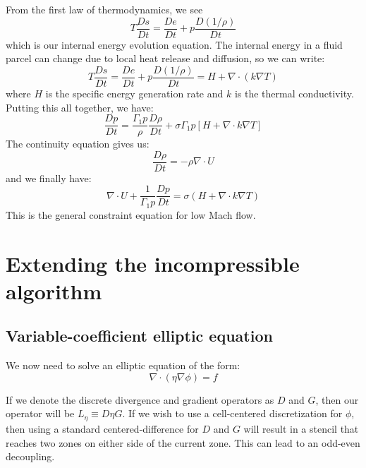 From the first law of thermodynamics, we see
\begin{equation}
T \frac{Ds}{Dt} = \frac{De}{Dt} + p \frac{D(1/\rho)}{Dt}
\end{equation}
which is our internal energy evolution equation.  The internal
energy in a fluid parcel can change due to local heat release and 
diffusion, so we can write:
\begin{equation}
T \frac{Ds}{Dt} = \frac{De}{Dt} + p \frac{D(1/\rho)}{Dt} = H + \nabla \cdot (k \nabla T)
\end{equation}
where $H$ is the specific energy generation rate and $k$ is the 
thermal conductivity.  Putting this all together, we have:
\begin{equation}
\frac{Dp}{Dt} = \frac{\Gamma_1 p}{\rho} \frac{D\rho}{Dt}
   + \sigma \Gamma_1 p \left [ H + \nabla \cdot k \nabla T \right ]
\end{equation}
The continuity equation gives us:
\begin{equation}
\frac{D\rho}{Dt} = -\rho \nabla \cdot U
\end{equation}
and we finally have:
\begin{equation}
\nabla \cdot U + \frac{1}{\Gamma_1 p}\frac{Dp}{Dt} = \sigma (H + \nabla \cdot k  \nabla T)
\end{equation}
This is the general constraint equation for low Mach flow.  

\section{Extending the incompressible algorithm}

\subsection{Variable-coefficient elliptic equation}

We now need to solve an elliptic equation of the form:
\begin{equation}
\nabla \cdot (\eta \nabla \phi) = f
\end{equation}

If we denote the discrete divergence and gradient operators as $D$ and $G$,
then our operator will be $L_\eta \equiv D \eta G$.  If we wish to
use a cell-centered discretization for $\phi$, then using a standard 
centered-difference for $D$ and $G$ will result in a stencil that reaches
two zones on either side of the current zone.  This can lead to an
odd-even decoupling. 

